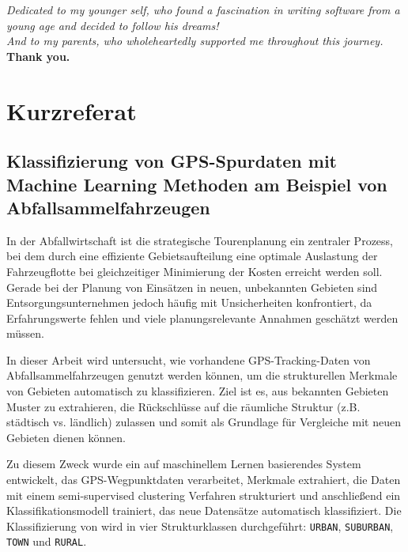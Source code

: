 \documentclass[a4paper,12pt,twoside]{scrreprt}
\begin{document}
\vspace{1cm}
\begin{center}
  \emph{Dedicated to my younger self, who found a fascination in writing
    software from
    a young age and decided to follow his dreams!}\\[0.5cm]
  \emph{And to my parents, who wholeheartedly supported me throughout this
    journey.}\\[0.5cm]
  \textbf{Thank you.}
\end{center}
\vspace{1cm}

\newpage
\section*{Kurzreferat}

\subsection*{Klassifizierung von GPS-Spurdaten mit Machine Learning Methoden am
  Beispiel von Abfallsammelfahrzeugen}

In der Abfallwirtschaft ist die strategische Tourenplanung ein zentraler
Prozess, bei dem durch eine effiziente Gebietsaufteilung eine optimale
Auslastung der Fahrzeugflotte bei gleichzeitiger Minimierung der Kosten
erreicht werden soll. Gerade bei der Planung von Einsätzen in neuen,
unbekannten Gebieten sind Entsorgungsunternehmen jedoch häufig mit
Unsicherheiten konfrontiert, da Erfahrungswerte fehlen und viele
planungsrelevante Annahmen geschätzt werden müssen.

In dieser Arbeit wird untersucht, wie vorhandene GPS-Tracking-Daten von
Abfallsammelfahrzeugen genutzt werden können, um die strukturellen Merkmale
von
Gebieten automatisch zu klassifizieren. Ziel ist es, aus bekannten Gebieten
Muster zu extrahieren, die Rückschlüsse auf die räumliche Struktur (z.B.
städtisch vs. ländlich) zulassen und somit als Grundlage für Vergleiche mit
neuen
Gebieten dienen können.

Zu diesem Zweck wurde ein auf maschinellem Lernen basierendes System
entwickelt, das
GPS-Wegpunktdaten verarbeitet, Merkmale extrahiert, die Daten mit einem
semi-supervised clustering Verfahren strukturiert und anschließend ein
Klassifikationsmodell trainiert, das neue Datensätze automatisch
klassifiziert. Die Klassifizierung von
wird in vier Strukturklassen durchgeführt: \texttt{URBAN},
\texttt{SUBURBAN}, \texttt{TOWN} und \texttt{RURAL}.
\end{document}
